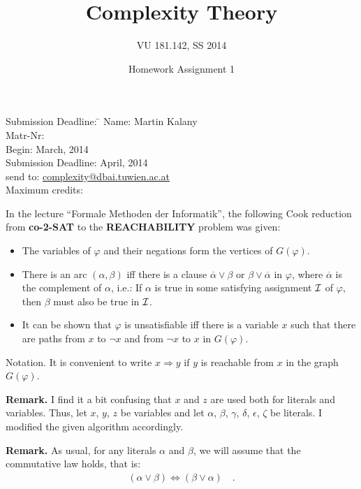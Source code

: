 \documentclass [11pt]{article}
\title{Complexity Theory}
\author{VU 181.142, SS 2014}
\date{Homework Assignment 1}
\newcommand{\Ra}{\Rightarrow}
\newcommand{\compl}[1]{\overline{#1}}
\renewcommand{\phi}{\varphi}
\def\a{\alpha}
\def\b{\beta}
\def\g{\gamma}
\def\d{\delta}
\def\e{\epsilon}
\def\z{\zeta}
\renewcommand{\em}{\rm}
\begin{document}
\maketitle

\begin{tabbing}
Submission Deadline: \quad \= \kill
Name: \> Martin Kalany \\
Matr-Nr:  \\
Begin:  March, 2014  \\
Submission Deadline:  April, 2014  \\
send to: \> \url{complexity@dbai.tuwien.ac.at}\\
Maximum credits:  
\end{tabbing}


\medskip


\noindent
In the lecture ``Formale Methoden der Informatik'', the following Cook reduction from {\bf co-2-SAT}
to the {\bf REACHABILITY} problem was given:

\begin{itemize}
\item The variables of $\phi$ and their negations form the vertices of
$G(\phi)$.
\item
There is an arc $(\alpha,\beta)$ iff there is a clause $\compl{\alpha}
\lor \beta$ or $\beta \lor \compl{\alpha}$ in $\phi$, 
where $\compl{\alpha}$ is the complement of $\alpha$, i.e.: If $\alpha$ is true
in some satisfying assignment ${\cal I}$ of $\phi$, then $\beta$ must also be true in ${\cal I}$.
\item It can be shown that $\phi$ is unsatisfiable iff there is a variable $x$ such that
there are paths from $x$ to $\neg x$ and from $\neg x$ to $x$ in
$G(\phi)$.
\end{itemize}

\noindent
{\em Notation.}
It is convenient to write $x \Ra y$ if $y$ is reachable from $x$ in 
the graph $G(\phi)$.

\bigskip

\noindent
{\em \bf{Remark.}}
I find it a bit confusing that $x$ and $z$ are used both for literals and variables. Thus, let $x$, $y$, $z$ be variables and let $\a$, $\b$, $\g$, $\d$, $\e$, $\z$ be literals. I modified the given algorithm accordingly. 

\smallskip
\noindent
{\em \bf{Remark.}}
As usual, for any literals $\a$ and $\b$, we will assume that the commutative law holds, that is:
\begin{align}
(\a \lor \b) \iff (\b \lor \a) \quad .
\end{align}
\end{document}
